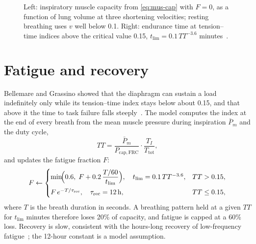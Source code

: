 \begin{figure}[ht]
\centering
{}
\caption{Left: inspiratory muscle capacity from \cref{eq:mus-cap} with $F = 0$, as a function of lung volume at three shortening velocities; resting breathing uses $v$ well below 0.1. Right: endurance time at tension--time indices above the critical value 0.15, $t_{\lim} = 0.1\,TT^{-3.6}$ minutes~\citep{bellemare1982}.}
\label{fig:mus-cap}
\end{figure}

\section{Fatigue and recovery}
\label{sec:mus-fat}
Bellemare and Grassino showed that the diaphragm can sustain a load indefinitely only while its tension--time index stays below about 0.15, and that above it the time to task failure falls steeply~\citep{bellemare1982}. The model computes the index at the end of every breath from the mean muscle pressure during inspiration $\bar P_m$ and the duty cycle,
\begin{equation}
TT = \frac{\bar P_m}{P_{\mathrm{cap,FRC}}}\cdot\frac{T_I}{T_{\mathrm{tot}}},
\label{eq:mus-tt}
\end{equation}
and updates the fatigue fraction $F$:
\begin{equation}
F \leftarrow \begin{cases}
\min\!\Bigl(0.6,\; F + 0.2\,\dfrac{T/60}{t_{\lim}}\Bigr),\quad t_{\lim} = 0.1\,TT^{-3.6}, & TT > 0.15,\\[8pt]
F\,e^{-T/\tau_{\mathrm{rec}}},\quad \tau_{\mathrm{rec}} = \SI{12}{\hour}, & TT \le 0.15,
\end{cases}
\label{eq:mus-fat}
\end{equation}
where $T$ is the breath duration in seconds. A breathing pattern held at a given $TT$ for $t_{\lim}$ minutes therefore loses 20\% of capacity, and fatigue is capped at a 60\% loss. Recovery is slow, consistent with the hours-long recovery of low-frequency fatigue~\citep{roussos1982}; the 12-hour constant is a model assumption.

